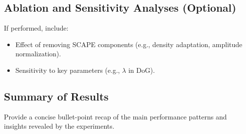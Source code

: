 \subsection{Ablation and Sensitivity Analyses (Optional)}
If performed, include:
\begin{itemize}
    \item Effect of removing SCAPE components (e.g., density adaptation, amplitude normalization).
    \item Sensitivity to key parameters (e.g., $\lambda$ in DoG).
\end{itemize}

\subsection{Summary of Results}
Provide a concise bullet-point recap of the main performance patterns and insights revealed by the experiments.
